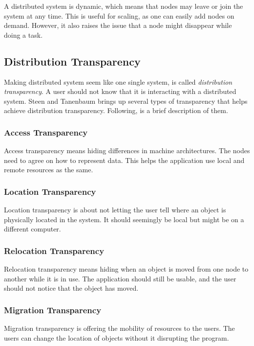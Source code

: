 A distributed system is dynamic, which means that nodes may leave or join the system at any time. This is useful for scaling, as one can easily add nodes on demand. However, it also raises the issue that a node might disappear while doing a task.



\subsection{Distribution Transparency}
Making distributed system seem like one single system, is called \textit{distribution transparency}. A user should not know that it is interacting with a distributed system. Steen and Tanenbaum\cite{steen_distributed_2017} brings up several types of transparency that helps achieve distribution transparency. Following, is a brief description of them.

\subsubsection{Access Transparency}
Access transparency means hiding differences in machine architectures. The nodes need to agree on how to represent data. This helps the application use local and remote resources as the same. 

\subsubsection{Location Transparency}
Location transparency is about not letting the user tell where an object is physically located in the system. It should seemingly be local but might be on a different computer.

\subsubsection{Relocation Transparency}
Relocation transparency means hiding when an object is moved from one node to another while it is in use. The application should still be usable, and the user should not notice that the object has moved.

\subsubsection{Migration Transparency}
Migration transparency is offering the mobility of resources to the users. The users can change the location of objects without it disrupting the program. 

